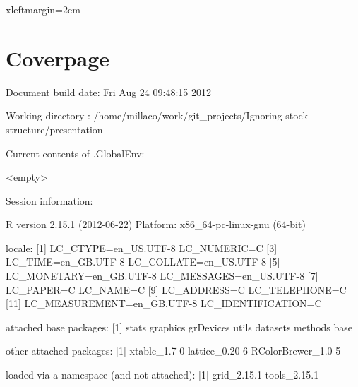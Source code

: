 \documentclass[a4paper,english]{article}
\begin{document}
 {xleftmargin=2em}
\renewenvironment{Schunk}{\vspace{\topsep}}{\vspace{\topsep}}

\section*{Coverpage}



\begin{Schunk}
\begin{Soutput}
Document build date: Fri Aug 24 09:48:15 2012 
\end{Soutput}
\begin{Soutput}
Working directory :
      /home/millaco/work/git_projects/Ignoring-stock-structure/presentation 
\end{Soutput}
\begin{Soutput}
Current contents of .GlobalEnv:
\end{Soutput}
\begin{Soutput}
     <empty>
\end{Soutput}
\begin{Soutput}
Session information:
\end{Soutput}
\begin{Soutput}
R version 2.15.1 (2012-06-22)
Platform: x86_64-pc-linux-gnu (64-bit)

locale:
 [1] LC_CTYPE=en_US.UTF-8       LC_NUMERIC=C              
 [3] LC_TIME=en_GB.UTF-8        LC_COLLATE=en_US.UTF-8    
 [5] LC_MONETARY=en_GB.UTF-8    LC_MESSAGES=en_US.UTF-8   
 [7] LC_PAPER=C                 LC_NAME=C                 
 [9] LC_ADDRESS=C               LC_TELEPHONE=C            
[11] LC_MEASUREMENT=en_GB.UTF-8 LC_IDENTIFICATION=C       

attached base packages:
[1] stats     graphics  grDevices utils     datasets  methods   base     

other attached packages:
[1] xtable_1.7-0       lattice_0.20-6     RColorBrewer_1.0-5

loaded via a namespace (and not attached):
[1] grid_2.15.1  tools_2.15.1
\end{Soutput}
\end{Schunk}

\cite{R.2012}
\end{document}
